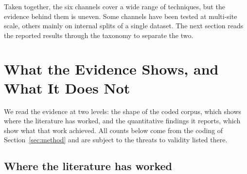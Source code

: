 \documentclass[acmsmall,screen,review]{acmart}
\theoremstyle{acmdefinition}
\begin{document}
Taken together, the six channels cover a wide range of techniques, but the evidence behind them is uneven. Some channels have been tested at multi-site scale, others mainly on internal splits of a single dataset. The next section reads the reported results through the taxonomy to separate the two.


\section{What the Evidence Shows, and What It Does Not}\label{sec:evidence}

We read the evidence at two levels: the shape of the coded corpus, which shows where the literature has worked, and the quantitative findings it reports, which show what that work achieved. All counts below come from the coding of Section~\ref{sec:method} and are subject to the threats to validity listed there.

\subsection{Where the literature has worked}\label{sec:S7_1}
\end{document}
